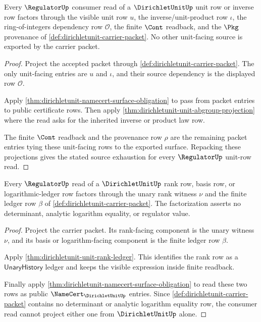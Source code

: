 \begin{theorem}
\label{thm:dirichletunit-regulator-unit-row-source-exhaustion}
Every $\RegulatorUp$ consumer read of a $\DirichletUnitUp$ unit row or inverse
row factors through the visible unit row $u$, the inverse/unit-product row
$\iota$, the ring-of-integers dependency row $\mathcal{O}$, the finite
$\Cont$ readback, and the $\Pkg$ provenance of
\autoref{def:dirichletunit-carrier-packet}. No other unit-facing source is
exported by the carrier packet.
\end{theorem}
\begin{proof}
Project the accepted packet through
\autoref{def:dirichletunit-carrier-packet}. The only unit-facing entries are
$u$ and $\iota$, and their source dependency is the displayed row
$\mathcal{O}$.

Apply \autoref{thm:dirichletunit-namecert-surface-obligation} to pass from
packet entries to public certificate rows. Then apply
\autoref{thm:dirichletunit-unit-abgroup-projection} where the read asks for
the inherited inverse or product law row.

The finite $\Cont$ readback and the provenance row $\rho$ are the remaining
packet entries tying these unit-facing rows to the exported surface. Repacking
these projections gives the stated source exhaustion for every
$\RegulatorUp$ unit-row read.
\end{proof}

\begin{theorem}
\label{thm:dirichletunit-regulator-rank-ledger-source}
Every $\RegulatorUp$ read of a $\DirichletUnitUp$ rank row, basis row, or
logarithmic-ledger row factors through the unary rank witness $\nu$ and the
finite ledger row $\beta$ of \autoref{def:dirichletunit-carrier-packet}. The
factorization asserts no determinant, analytic logarithm equality, or
regulator value.
\end{theorem}
\begin{proof}
Project the carrier packet. Its rank-facing component is the unary witness
$\nu$, and its basis or logarithm-facing component is the finite ledger row
$\beta$.

Apply \autoref{thm:dirichletunit-unit-rank-ledger}. This identifies the rank
row as a $\mathsf{UnaryHistory}$ ledger and keeps the visible expression inside
finite readback.

Finally apply \autoref{thm:dirichletunit-namecert-surface-obligation} to read
these two rows as public $\NameCert_{\DirichletUnitUp}$ entries. Since
\autoref{def:dirichletunit-carrier-packet} contains no determinant or analytic
logarithm equality row, the consumer read cannot project either one from
$\DirichletUnitUp$ alone.
\end{proof}


